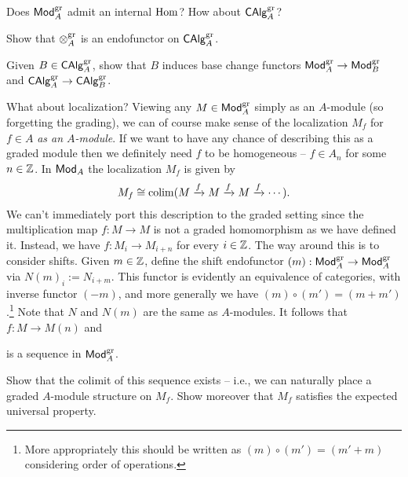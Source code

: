 \documentclass[11pt]{article}
\begin{document}
\begin{exercise}
Does $\operatorname{\mathsf{Mod}}_A^{\operatorname{gr}}$ admit an internal $\operatorname{Hom}$? How about $\operatorname{\mathsf{CAlg}}_A^{\operatorname{gr}}$?
\end{exercise}

\begin{exercise}
\hfill
\begin{enum}{\alph}
\item Show that $\otimes_A^{\operatorname{gr}}$ is an endofunctor on $\operatorname{\mathsf{CAlg}}_A^{\operatorname{gr}}$.

\item Given $B\in\operatorname{\mathsf{CAlg}}_A^{\operatorname{gr}}$, show that $B$ induces base change functors $\operatorname{\mathsf{Mod}}_A^{\operatorname{gr}}\to\operatorname{\mathsf{Mod}}_B^{\operatorname{gr}}$ and $\operatorname{\mathsf{CAlg}}_A^{\operatorname{gr}}\to\operatorname{\mathsf{CAlg}}_B^{\operatorname{gr}}$.
\end{enum}
\end{exercise}

What about localization? Viewing any $M\in\operatorname{\mathsf{Mod}}_A^{\operatorname{gr}}$ simply as an $A$-module (so forgetting the grading), we can of course make sense of the localization $M_f$ for $f\in A$ \emph{as an $A$-module}. If we want to have any chance of describing this as a graded module then we definitely need $f$ to be homogeneous -- $f\in A_n$ for some $n\in\mathbb{Z}$. In $\operatorname{\mathsf{Mod}}_A$ the localization $M_f$ is given by 
$$M_f\cong\operatorname{colim}(M\xrightarrow{f}M\xrightarrow{f}M\xrightarrow{f}\cdots).$$
We can't immediately port this description to the graded setting since the multiplication map $f: M\to M$ is not a graded homomorphism as we have defined it. Instead, we have $f: M_i\to M_{i+n}$ for every $i\in\mathbb{Z}$. The way around this is to consider shifts. Given $m\in\mathbb{Z}$, define the shift endofunctor $(m): \operatorname{\mathsf{Mod}}_A^{\operatorname{gr}}\to\operatorname{\mathsf{Mod}}_A^{\operatorname{gr}}$ via $N(m)_i:=N_{i+m}$. This functor is evidently an equivalence of categories, with inverse functor $(-m)$, and more generally we have $(m)\circ(m')=(m+m')$.\footnote{More appropriately this should be written as $(m)\circ(m')=(m'+m)$ considering order of operations.} Note that $N$ and $N(m)$ are the same as $A$-modules. It follows that $f: M\to M(n)$ and 
\begin{center}
\end{center}
is a sequence in $\operatorname{\mathsf{Mod}}_A^{\operatorname{gr}}$.

\begin{exercise}
Show that the colimit of this sequence exists -- i.e., we can naturally place a graded $A$-module structure on $M_f$. Show moreover that $M_f$ satisfies the expected universal property.
\end{exercise}
\end{document}
